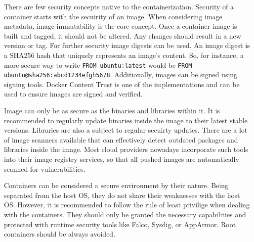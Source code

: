 There are few security concepts native to the containerization. Security of a container starts with the secuirity of an image. When considering image metadata, image immutability is the core concept. Once a container image is built and tagged, it should not be altered. Any changes should result in a new version or tag. For further security image digests can be used. An image digest is a SHA256 hash that uniquely represents an image's content. So, for instance, a more secure way to write \lstinline{FROM ubuntu:latest} would be \lstinline{FROM ubuntu@sha256:abcd1234efgh5678}. Additionally, images can be signed using signing tools. Docker Content Trust is one of the implementations and can be used to ensure images are signed and verified.

Image can only be as secure as the binaries and libraries within it. It is recommended to regularly update binaries inside the image to their latest stable versions. Libraries are also a subject to regular secuirty updates. There are a lot of image scanners available that can effectively detect outdated packages and libraries inside the image. Most cloud providers nowadays incorporate such tools into their image registry services, so that all pushed images are automatically scanned for vulnerabilities.

Containers can be considered a secure environment by their nature. Being separated from the host OS, they do not share their weaknesses with the host OS. However, it is recommended to follow the rule of least privilige when dealing with the containers. They should only be granted the necessary capabilities and protected with runtime security tools like Falco, Sysdig, or AppArmor. Root containers should be always avoided.